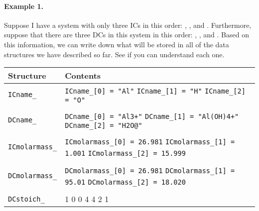 \documentclass{article}
\begin{document}
\paragraph{Example 1.}  Suppose I have a system with only three ICs in this order:
, , and .  Furthermore, suppose that there are three DCs in this
system in this order: , , and .  Based on this
information, we can write down what will be stored in all of the data structures
we have described so far.  See if you can understand each one.

\scriptsize{
\begin{tabular}{l p{4.0in}} \toprule
\textbf{Structure} & \textbf{Contents} \\ \midrule
\verb!ICname_! & \verb!ICname_[0] = "Al"! \hspace{0.1in} 
                 \verb!ICname_[1] = "H"!  \hspace{0.1in}
                 \verb!ICname_[2] = "O"! \\
                 & \\
\verb!DCname_! & \verb!DCname_[0] = "Al3+"! \hspace{0.1in}
                 \verb!DCname_[1] = "Al(OH)4+"! \hspace{0.1in}
                 \verb!DCname_[2] = "H2O@"! \\
                 & \\
\verb!ICmolarmass_! & \verb!ICmolarmass_[0] = 26.981! \hspace{0.1in}
                 \verb!ICmolarmass_[1] = 1.001! \hspace{0.1in}
                      \verb!ICmolarmass_[2] = 15.999! \\
                 & \\
\verb!DCmolarmass_! & \verb!DCmolarmass_[0] = 26.981! \hspace{0.1in}
                 \verb!DCmolarmass_[1] = 95.01! \hspace{0.1in}
                      \verb!DCmolarmass_[2] = 18.020! \\
                 & \\
\verb!DCstoich_! &     1 \hspace{0.25in} 0 \hspace{0.25in} 0 \newline
                       1 \hspace{0.25in} 4 \hspace{0.25in} 4 \newline
                       0 \hspace{0.25in} 2 \hspace{0.25in} 1 \\ \bottomrule
\end{tabular}
}
\end{document}
